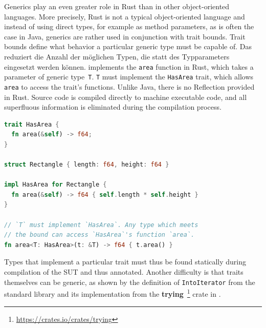 \documentclass[paper=a4,%
  twoside,%
  BCOR4mm,%
  abstract=true,%
  toc=bibliography,%
  chapterprefix=true,%
  toc=bibliographynumbered,%
  open=right,%
  english,%
  pagesize=pdftex]{scrreprt}
\begin{document}
%
%
%


Generics play an even greater role in Rust than in other object-oriented languages. More precisely, Rust is not a typical object-oriented language and instead of using direct types, for example as method parameters, as is often the case in Java, generics are rather used in conjunction with trait bounds. Trait bounds define what behavior a particular generic type must be capable of. Das reduziert die Anzahl der möglichen Typen, die statt des Typparameters eingesetzt werden können.  implements the \lstinline{area} function in Rust, which takes a parameter of generic type~\lstinline{T}. \lstinline{T} must implement the \lstinline{HasArea} trait, which allows \lstinline{area} to access the trait's functions. Unlike Java, there is no Reflection provided in Rust. Source code is compiled directly to machine executable code, and all superfluous information is eliminated during the compilation process.

\begin{lstlisting}[language=Rust, style=boxed, caption={A function that takes a generic types and specifies a bound}, label=lst:trait-bounds-example]
trait HasArea {
  fn area(&self) -> f64;
}

struct Rectangle { length: f64, height: f64 }

impl HasArea for Rectangle {
  fn area(&self) -> f64 { self.length * self.height }
}

// `T` must implement `HasArea`. Any type which meets
// the bound can access `HasArea`'s function `area`.
fn area<T: HasArea>(t: &T) -> f64 { t.area() }
\end{lstlisting}

Types that implement a particular trait must thus be found statically during compilation of the \ac{SUT} and thus annotated. Another difficulty is that traits themselves can be generic, as shown by the definition of \lstinline{IntoIterator} from the standard library and its implementation from the \textbf{trying}~\footnote{\url{https://crates.io/crates/trying}} crate in .
\end{document}
